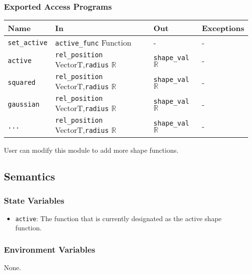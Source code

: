 \documentclass[12pt, titlepage]{article}
\begin{document}
\subsubsection{Exported Access Programs}
\begin{center}
\begin{tabular}{p{2cm} p{5.6cm} p{3cm} p{2cm}}
\hline
\textbf{Name} & \textbf{In} & \textbf{Out} & \textbf{Exceptions} \\
\hline
\texttt{set\_active} & \texttt{active\_func} Function & - & - \\
\texttt{active}& \texttt{rel\_position} VectorT,\newline\texttt{radius} $\mathbb{R}$ & \texttt{shape\_val} $\mathbb{R}$ & - \\
\texttt{squared}& \texttt{rel\_position} VectorT,\newline\texttt{radius} $\mathbb{R}$ & \texttt{shape\_val} $\mathbb{R}$ & - \\
\texttt{gaussian}& \texttt{rel\_position} VectorT,\newline\texttt{radius} $\mathbb{R}$ & \texttt{shape\_val} $\mathbb{R}$ & - \\
\texttt{...}& \texttt{rel\_position} VectorT,\newline\texttt{radius} $\mathbb{R}$ & \texttt{shape\_val} $\mathbb{R}$ & - \\
\hline
\end{tabular}
\end{center}
User can modify this module to add more shape functions.

\subsection{Semantics}

\subsubsection{State Variables}
\begin{itemize}
  \item \texttt{active}: The function that is currently designated as the active shape function.
\end{itemize}

\subsubsection{Environment Variables}
None.
\end{document}
